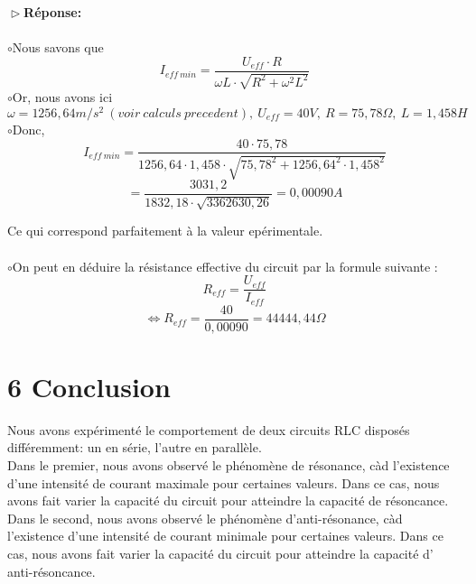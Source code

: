 \documentclass{report}
\begin{document}
\textbf{$\vartriangleright$R\'eponse:} \\ ~~\\
$\circ$Nous savons que 
$$ I_{eff\ min} = \frac{U_{eff} \cdot R}{\omega L \cdot \sqrt{R^{2} + \omega^{2} L^{2}}} $$ 
$\circ$Or, nous avons ici
$$\omega = 1256,64m/s^{2}\ (voir\ calculs\ precedent),\ U_{eff} = 40V,\ R = 75,78\Omega,\ L = 1,458H$$
$\circ$Donc,
$$ I_{eff\ min} = \frac{40 \cdot 75,78}{1256,64 \cdot 1,458 \cdot \sqrt{75,78^{2} + 1256,64^{2} \cdot 1,458^{2}}}$$
$$  = \frac{3031,2}{1832,18 \cdot \sqrt{3362630,26}} = 0,00090A $$

Ce qui correspond parfaitement \`a la valeur ep\'erimentale.\\ ~~\\
$\circ$On peut en d\'eduire la r\'esistance effective du circuit par la formule suivante :
$$ R_{eff} = \frac{U_{eff}}{I_{eff}} $$
$$ \Longleftrightarrow R_{eff} = \frac{40}{0,00090} = 44444,44\Omega$$
\section*{6 Conclusion}
\hspace*{1cm}Nous avons exp\'eriment\'e le comportement de deux circuits RLC dispos\'es diff\'eremment: un en s\'erie, l'autre en parall\`ele. \\
\hspace*{1cm}Dans le premier, nous avons observ\'e le ph\'enom\`ene de r\'esonance, c\`ad l'existence d'une intensit\'e de courant maximale pour certaines valeurs. Dans ce cas, nous avons fait varier la capacit\'e du circuit pour atteindre la capacit\'e de r\'esoncance.\\
\hspace*{1cm}Dans le second, nous avons observ\'e le ph\'enom\`ene d'anti-r\'esonance, c\`ad l'existence d'une intensit\'e de courant minimale pour certaines valeurs. Dans ce cas, nous avons fait varier la capacit\'e du circuit pour atteindre la capacit\'e d' anti-r\'esoncance.\\
\end{document}
